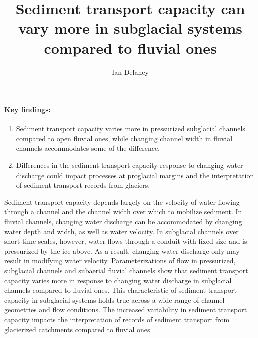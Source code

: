 \documentclass[11pt]{article}
\author[1]{Ian Delaney}
\affil[1]{Institut des dynamiques de la surface terrestre (IDYST), Universit\'{e} de Lausanne, B\^{a}timent G\'{e}opolis, CH-1015 Lausanne}
\title{Sediment transport capacity can vary more in subglacial systems compared to fluvial ones}
\begin{document}
        \maketitle
        
        \paragraph{Key findings:}
        \begin{enumerate}
        \item Sediment transport capacity varies more in pressurized subglacial channels compared to open fluvial ones, while changing channel width  in fluvial channels accommodates some of the difference.
        \item Differences in the sediment transport capacity response to changing water discharge could impact processes at proglacial margins and the interpretation of sediment transport records from glaciers. 
        \end{enumerate}
        
        \abstract %
        Sediment transport capacity depends largely on the velocity of water flowing through a channel and the channel width over which to mobilize sediment.
        In fluvial channels, changing water discharge can be accommodated by changing water depth and width, as well as water velocity.
        In subglacial channels over short time scales, however, water flows through a conduit with fixed size and is pressurized by the ice above.
        As a result, changing water discharge only may result in modifying water velocity.
        Parameterizations of flow in pressurized, subglacial channels and  subaerial fluvial channels show that sediment transport capacity varies  more in response to changing water discharge in subglacial channels compared to fluvial ones.
        This characteristic of sediment transport capacity in subglacial systems holds true  across a wide range of channel geometries and flow conditions.
        The increased variability in sediment transport capacity impacts the interpretation of records of sediment transport from glacierized catchments compared to fluvial ones. 
        
        \vspace{0.5cm}
        
\end{document}
